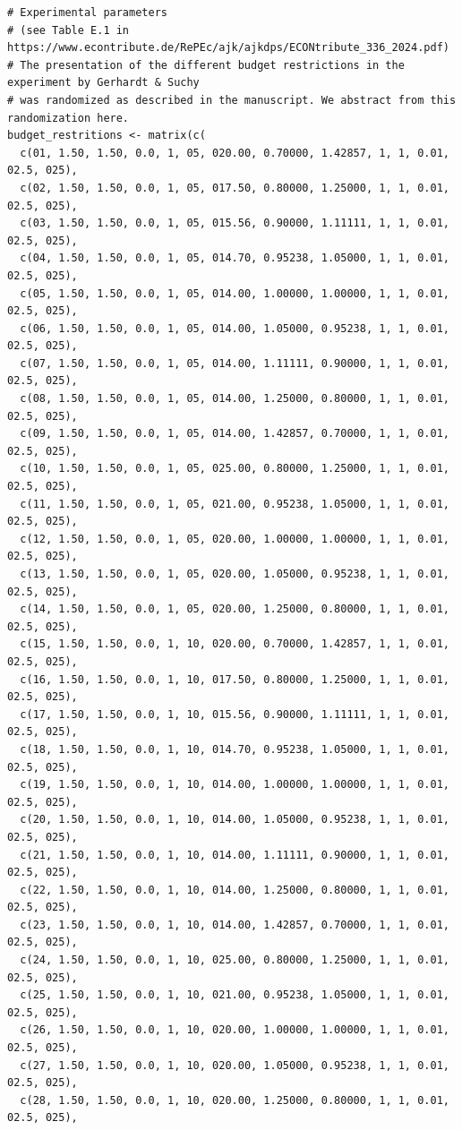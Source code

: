 \begin{lstlisting}
# Experimental parameters
# (see Table E.1 in https://www.econtribute.de/RePEc/ajk/ajkdps/ECONtribute_336_2024.pdf)
# The presentation of the different budget restrictions in the experiment by Gerhardt & Suchy
# was randomized as described in the manuscript. We abstract from this randomization here.
budget_restritions <- matrix(c(
  c(01, 1.50, 1.50, 0.0, 1, 05, 020.00, 0.70000, 1.42857, 1, 1, 0.01, 02.5, 025),
  c(02, 1.50, 1.50, 0.0, 1, 05, 017.50, 0.80000, 1.25000, 1, 1, 0.01, 02.5, 025),
  c(03, 1.50, 1.50, 0.0, 1, 05, 015.56, 0.90000, 1.11111, 1, 1, 0.01, 02.5, 025),
  c(04, 1.50, 1.50, 0.0, 1, 05, 014.70, 0.95238, 1.05000, 1, 1, 0.01, 02.5, 025),
  c(05, 1.50, 1.50, 0.0, 1, 05, 014.00, 1.00000, 1.00000, 1, 1, 0.01, 02.5, 025),
  c(06, 1.50, 1.50, 0.0, 1, 05, 014.00, 1.05000, 0.95238, 1, 1, 0.01, 02.5, 025),
  c(07, 1.50, 1.50, 0.0, 1, 05, 014.00, 1.11111, 0.90000, 1, 1, 0.01, 02.5, 025),
  c(08, 1.50, 1.50, 0.0, 1, 05, 014.00, 1.25000, 0.80000, 1, 1, 0.01, 02.5, 025),
  c(09, 1.50, 1.50, 0.0, 1, 05, 014.00, 1.42857, 0.70000, 1, 1, 0.01, 02.5, 025),
  c(10, 1.50, 1.50, 0.0, 1, 05, 025.00, 0.80000, 1.25000, 1, 1, 0.01, 02.5, 025),
  c(11, 1.50, 1.50, 0.0, 1, 05, 021.00, 0.95238, 1.05000, 1, 1, 0.01, 02.5, 025),
  c(12, 1.50, 1.50, 0.0, 1, 05, 020.00, 1.00000, 1.00000, 1, 1, 0.01, 02.5, 025),
  c(13, 1.50, 1.50, 0.0, 1, 05, 020.00, 1.05000, 0.95238, 1, 1, 0.01, 02.5, 025),
  c(14, 1.50, 1.50, 0.0, 1, 05, 020.00, 1.25000, 0.80000, 1, 1, 0.01, 02.5, 025),
  c(15, 1.50, 1.50, 0.0, 1, 10, 020.00, 0.70000, 1.42857, 1, 1, 0.01, 02.5, 025),
  c(16, 1.50, 1.50, 0.0, 1, 10, 017.50, 0.80000, 1.25000, 1, 1, 0.01, 02.5, 025),
  c(17, 1.50, 1.50, 0.0, 1, 10, 015.56, 0.90000, 1.11111, 1, 1, 0.01, 02.5, 025),
  c(18, 1.50, 1.50, 0.0, 1, 10, 014.70, 0.95238, 1.05000, 1, 1, 0.01, 02.5, 025),
  c(19, 1.50, 1.50, 0.0, 1, 10, 014.00, 1.00000, 1.00000, 1, 1, 0.01, 02.5, 025),
  c(20, 1.50, 1.50, 0.0, 1, 10, 014.00, 1.05000, 0.95238, 1, 1, 0.01, 02.5, 025),
  c(21, 1.50, 1.50, 0.0, 1, 10, 014.00, 1.11111, 0.90000, 1, 1, 0.01, 02.5, 025),
  c(22, 1.50, 1.50, 0.0, 1, 10, 014.00, 1.25000, 0.80000, 1, 1, 0.01, 02.5, 025),
  c(23, 1.50, 1.50, 0.0, 1, 10, 014.00, 1.42857, 0.70000, 1, 1, 0.01, 02.5, 025),
  c(24, 1.50, 1.50, 0.0, 1, 10, 025.00, 0.80000, 1.25000, 1, 1, 0.01, 02.5, 025),
  c(25, 1.50, 1.50, 0.0, 1, 10, 021.00, 0.95238, 1.05000, 1, 1, 0.01, 02.5, 025),
  c(26, 1.50, 1.50, 0.0, 1, 10, 020.00, 1.00000, 1.00000, 1, 1, 0.01, 02.5, 025),
  c(27, 1.50, 1.50, 0.0, 1, 10, 020.00, 1.05000, 0.95238, 1, 1, 0.01, 02.5, 025),
  c(28, 1.50, 1.50, 0.0, 1, 10, 020.00, 1.25000, 0.80000, 1, 1, 0.01, 02.5, 025),

\end{lstlisting}
